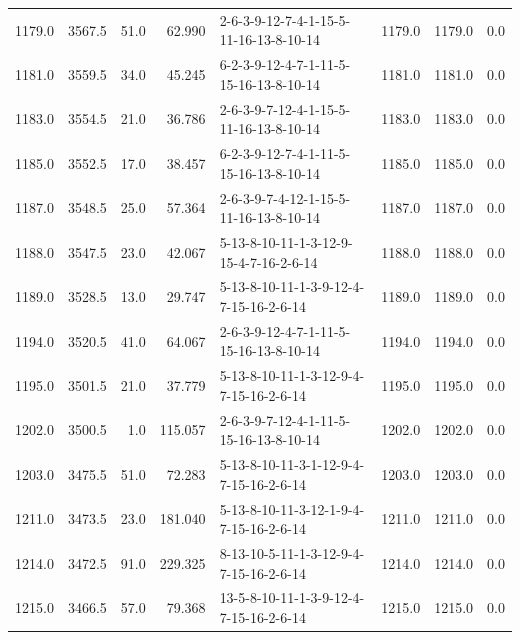 \begin{tabular}{rrrrlrrr}
 1179.0 &  3567.5 &           51.0 &             62.990 &  2-6-3-9-12-7-4-1-15-5-11-16-13-8-10-14 &        1179.0 &          1179.0 &       0.0 \\
 1181.0 &  3559.5 &           34.0 &             45.245 &  6-2-3-9-12-4-7-1-11-5-15-16-13-8-10-14 &        1181.0 &          1181.0 &       0.0 \\
 1183.0 &  3554.5 &           21.0 &             36.786 &  2-6-3-9-7-12-4-1-15-5-11-16-13-8-10-14 &        1183.0 &          1183.0 &       0.0 \\
 1185.0 &  3552.5 &           17.0 &             38.457 &  6-2-3-9-12-7-4-1-11-5-15-16-13-8-10-14 &        1185.0 &          1185.0 &       0.0 \\
 1187.0 &  3548.5 &           25.0 &             57.364 &  2-6-3-9-7-4-12-1-15-5-11-16-13-8-10-14 &        1187.0 &          1187.0 &       0.0 \\
 1188.0 &  3547.5 &           23.0 &             42.067 &  5-13-8-10-11-1-3-12-9-15-4-7-16-2-6-14 &        1188.0 &          1188.0 &       0.0 \\
 1189.0 &  3528.5 &           13.0 &             29.747 &  5-13-8-10-11-1-3-9-12-4-7-15-16-2-6-14 &        1189.0 &          1189.0 &       0.0 \\
 1194.0 &  3520.5 &           41.0 &             64.067 &  2-6-3-9-12-4-7-1-11-5-15-16-13-8-10-14 &        1194.0 &          1194.0 &       0.0 \\
 1195.0 &  3501.5 &           21.0 &             37.779 &  5-13-8-10-11-1-3-12-9-4-7-15-16-2-6-14 &        1195.0 &          1195.0 &       0.0 \\
 1202.0 &  3500.5 &            1.0 &            115.057 &  2-6-3-9-7-12-4-1-11-5-15-16-13-8-10-14 &        1202.0 &          1202.0 &       0.0 \\
 1203.0 &  3475.5 &           51.0 &             72.283 &  5-13-8-10-11-3-1-12-9-4-7-15-16-2-6-14 &        1203.0 &          1203.0 &       0.0 \\
 1211.0 &  3473.5 &           23.0 &            181.040 &  5-13-8-10-11-3-12-1-9-4-7-15-16-2-6-14 &        1211.0 &          1211.0 &       0.0 \\
 1214.0 &  3472.5 &           91.0 &            229.325 &  8-13-10-5-11-1-3-12-9-4-7-15-16-2-6-14 &        1214.0 &          1214.0 &       0.0 \\
 1215.0 &  3466.5 &           57.0 &             79.368 &  13-5-8-10-11-1-3-9-12-4-7-15-16-2-6-14 &        1215.0 &          1215.0 &       0.0 \\

\end{tabular}
